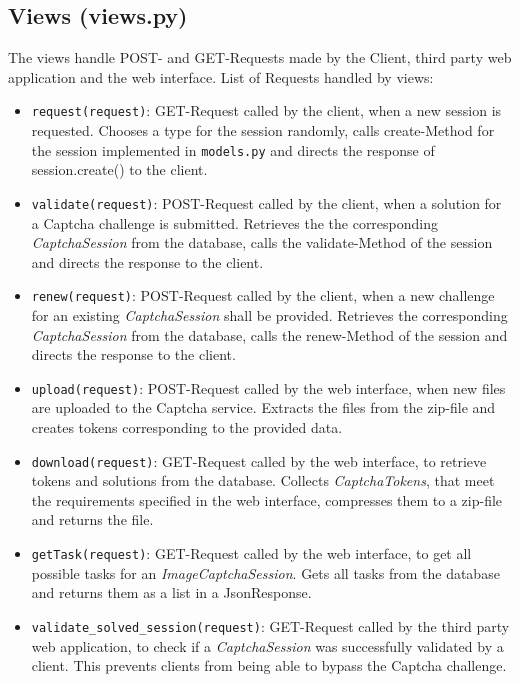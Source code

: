 \clearpage
\subsection{Views (views.py)}

The views handle POST- and GET-Requests made by the Client, third party web application and the web interface. List of Requests handled by views:

\begin{itemize}
\item \verb|request(request)|: GET-Request called by the client, when a new session is requested. Chooses a type for the session randomly, calls create-Method for the session implemented in \verb|models.py| and directs the response of session.create() to the client.
\item \verb|validate(request)|: POST-Request called by the client, when a solution for a Captcha challenge is submitted. Retrieves the the corresponding \emph{CaptchaSession} from the database, calls the validate-Method of the session and directs the response to the client.
\item \verb|renew(request)|: POST-Request called by the client, when a new challenge for an existing \emph{CaptchaSession} shall be provided. Retrieves the corresponding \emph{CaptchaSession} from the database, calls the renew-Method of the session and directs the response to the client.
\item \verb|upload(request)|: POST-Request called by the web interface, when new files are uploaded to the Captcha service. Extracts the files from the zip-file and creates tokens corresponding to the provided data.
\item \verb|download(request)|: GET-Request called by the web interface, to retrieve tokens and solutions from the database. Collects \emph{CaptchaTokens}, that meet the requirements specified in the web interface, compresses them to a zip-file and returns the file.
\item \verb|getTask(request)|: GET-Request called by the web interface, to get all possible tasks for an \emph{ImageCaptchaSession}. Gets all tasks from the database and returns them as a list in a JsonResponse.
\item \verb|validate_solved_session(request)|: GET-Request called by the third party web application, to check if a \emph{CaptchaSession} was successfully validated by a client. This prevents clients from being able to bypass the Captcha challenge.
\end{itemize}

\clearpage

